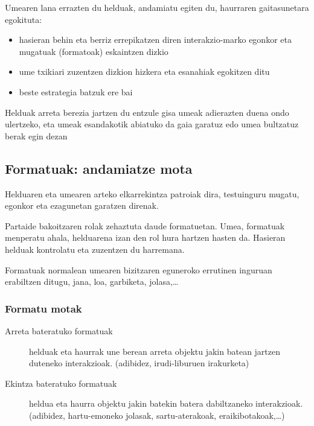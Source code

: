 \documentclass[
]{book}
\providecommand{\tightlist}{%
  \setlength{\itemsep}{0pt}\setlength{\parskip}{0pt}}
\begin{document}
Umearen lana errazten du helduak, andamiatu egiten du, haurraren gaitasunetara egokituta:

\begin{itemize}
\tightlist
\item
  hasieran behin eta berriz errepikatzen diren interakzio-marko egonkor eta mugatuak (formatoak) eskaintzen dizkio
\item
  ume txikiari zuzentzen dizkion hizkera eta esanahiak egokitzen ditu
\item
  beste estrategia batzuk ere bai
\end{itemize}

Helduak arreta berezia jartzen du entzule gisa umeak adierazten duena ondo ulertzeko, eta umeak esandakotik abiatuko da gaia garatuz edo umea bultzatuz berak egin dezan

\hypertarget{formatuak-andamiatze-mota}{%
\subsection{Formatuak: andamiatze mota}\label{formatuak-andamiatze-mota}}

Helduaren eta umearen arteko elkarrekintza patroiak dira, testuinguru mugatu, egonkor eta ezagunetan garatzen direnak.

Partaide bakoitzaren rolak zehaztuta daude formatuetan. Umea, formatuak menperatu ahala, helduarena izan den rol hura hartzen hasten da. Hasieran helduak kontrolatu eta zuzentzen du harremana.

Formatuak normalean umearen bizitzaren eguneroko errutinen inguruan erabiltzen ditugu, jana, loa, garbiketa, jolasa,\ldots{}

\hypertarget{formatu-motak}{%
\subsubsection{Formatu motak}\label{formatu-motak}}

\begin{description}
\item[Arreta bateratuko formatuak]
helduak eta haurrak une berean arreta objektu jakin batean jartzen duteneko interakzioak. (adibidez, irudi-liburuen irakurketa)
\item[Ekintza bateratuko formatuak]
heldua eta haurra objektu jakin batekin batera dabiltzaneko interakzioak. (adibidez, hartu-emoneko jolasak, sartu-aterakoak, eraikibotakoak,\ldots)
\end{description}
\end{document}
